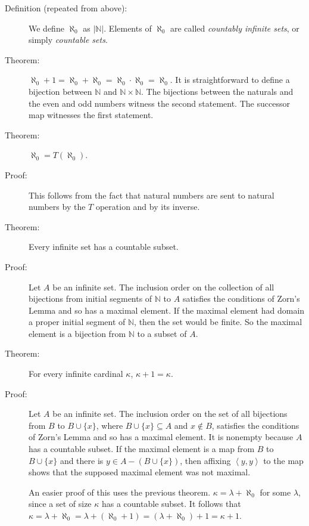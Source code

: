 \documentclass[12pt]{book}
\begin{document}
\begin{description}

\item[Definition (repeated from above):]   We define $\aleph_0$ as
$|\mathbb N|$.  Elements of $\aleph_0$ are called  {\em countably infinite
sets\/}, or simply {\em countable sets\/}.

\item[Theorem:] $\aleph_0+1 = \aleph_0+\aleph_0 = \aleph_0 \cdot
\aleph_0 = \aleph_0$.  It is straightforward to define a bijection
between $\mathbb N$ and $\mathbb N\times \mathbb N$.  The bijections
between the naturals and the even and odd numbers witness the second
statement.  The successor map witnesses the first statement.

\item[Theorem:]  $\aleph_0 = T(\aleph_0)$.

\item[Proof:] This follows from the fact that natural numbers are sent
to natural numbers by the $T$ operation and by its inverse.

\item[Theorem:]  Every infinite set has a countable subset.

\item[Proof:] Let $A$ be an infinite set.  The inclusion order on the
collection of all bijections from initial segments of $\mathbb N$ to
$A$ satisfies the conditions of Zorn's Lemma and so has a maximal
element.  If the maximal element had domain a proper initial segment
of $\mathbb N$, then the set would be finite.  So the maximal element
is a bijection from $\mathbb N$ to a subset of $A$.

\item[Theorem:]  For every infinite cardinal $\kappa$, $\kappa+1 = \kappa$.

\item[Proof:] Let $A$ be an infinite set.  The inclusion order on the
set of all bijections from $B$ to $B \cup \{x\}$, where $B \cup \{x\}
\subseteq A$ and $x \not\in B$, satisfies the conditions of Zorn's
Lemma and so has a maximal element.  It is nonempty because $A$ has a
countable subset.  If the maximal element is a map from $B$ to $B \cup
\{x\}$ and there is $y \in A-(B\cup \{x\})$, then affixing
$\left<y,y\right>$ to the map shows that the supposed maximal element
was not maximal.

An easier proof of this uses the previous theorem.  $\kappa = \lambda+\aleph_0$ for some $\lambda$, since a set of size $\kappa$ has a countable subset.  It follows
that $\kappa=\lambda+\aleph_0=\lambda+(\aleph_0+1)=(\lambda+\aleph_0)+1=\kappa+1$.


\end{description}
\end{document}
